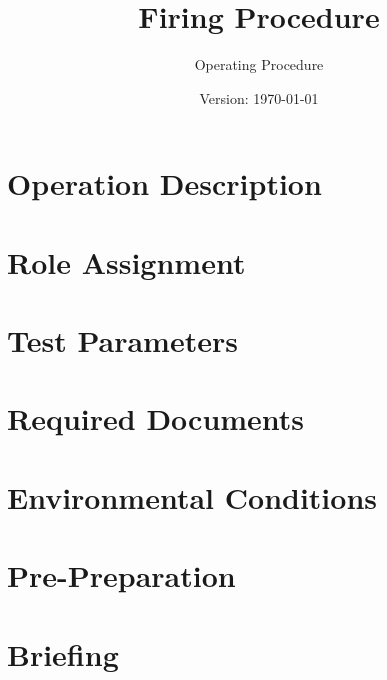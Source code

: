 \documentclass{article}
\title{Firing Procedure}
\author{Operating Procedure}
\date{Version: \isodate\today}
\begin{document}
\maketitle

\thispagestyle{fancy}

\renewcommand{\thesection}{\Alph{section}}

\section{Operation Description}


\section{Role Assignment}


\section{Test Parameters}


\section{Required Documents}


\section{Environmental Conditions}


\newpage

\renewcommand{\thesection}{\arabic{section}}

\setcounter{section}{0}

\section{Pre-Preparation}


\section{Briefing}

\end{document}

